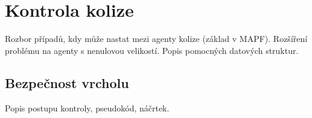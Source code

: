 \section{Kontrola kolize}\label{sec:kolize}

Rozbor případů, kdy může nastat mezi agenty kolize (základ v MAPF).
Rozšíření problému na agenty s nenulovou velikostí.
Popis pomocných datových struktur.

%
%
%
\subsection{Bezpečnost vrcholu}\label{subsec:bezpecnost_vrcholu}

Popis postupu kontroly, pseudokód, náčrtek.

%
%
%
%
